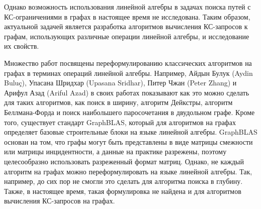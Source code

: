 Однако возможность использования линейной алгебры в задачах поиска путей с КС-ограничениями в графах в настоящее время не исследована. Таким образом, актуальной задачей является разработка алгоритмов вычисления КС-запросов к графам, использующих различные операции линейной алгебры, и исследование их свойств.





{\progress}
Множество работ посвящены переформулированию классических алгоритмов на графах в терминах операций линейной алгебры. Например, Айдын Булук (Aydin Bulu\c{c}), 
Упасана Шридхар (Upasana Sridhar), Питер Чжан (Peter Zhang) и Арифул Азад (Ariful Azad) в своих работах показывают как это можно сделать для таких алгоритмов, как поиск в ширину, алгоритм Дейкстры, алгоритм Беллмана-Форда и поиск наибольшего паросочетания в двудольном графе. Кроме того, существует стандарт GraphBLAS, который для алгоритмов на графах определяет базовые строительные блоки на языке линейной алгебры. GraphBLAS основан на том, что графы могут быть представлены в виде матрицы смежности или матрицы инцидентности, а данные на практике разрежены, поэтому целесообразно использовать разреженный формат матриц. Однако, не каждый алгоритм на графах можно переформулировать на языке линейной алгебры. Так, например, до сих пор не смогли это сделать для алгоритма поиска в глубину. Также, в настоящее время, такая формулировка не найдена и для алгоритмов вычисления КС-запросов на графах.


